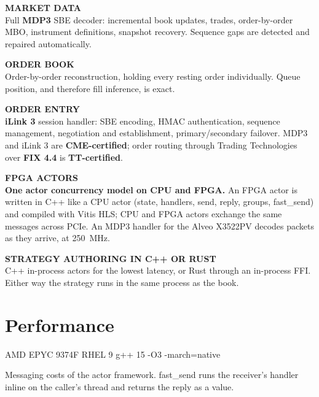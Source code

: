 \documentclass[10pt]{article}
\newcommand{\code}[1]{{\ttfamily\small #1}}
\newcommand{\tile}[2]{%
  {\color{ink3}\sffamily\bfseries\scriptsize\MakeUppercase{#1}}\\[1pt]
  \footnotesize #2\par\vspace{5pt}}
\begin{document}
\begin{minipage}[t]{0.485\textwidth}

\tile{Market data}{Full \textbf{MDP3} SBE decoder: incremental book updates,
trades, order-by-order MBO, instrument definitions, snapshot recovery. Sequence
gaps are detected and repaired automatically.}

\tile{Order book}{Order-by-order reconstruction, holding every resting order
individually. Queue position, and therefore fill inference, is
exact.}

\tile{Order entry}{\textbf{iLink 3} session handler: SBE encoding, HMAC
authentication, sequence management, negotiation and establishment,
primary/secondary failover. MDP3 and iLink 3 are \textbf{CME-certified}; order
routing through Trading Technologies over \textbf{FIX 4.4} is
\textbf{TT-certified}.}

\tile{FPGA actors}{\textbf{One actor concurrency model on CPU and FPGA.} An FPGA
actor is written in C++ like a CPU actor (state, handlers, \code{send},
\code{reply}, groups, \code{fast\_send}) and compiled with Vitis HLS; CPU and
FPGA actors exchange the same messages across PCIe. An MDP3 handler for the
Alveo X3522PV decodes packets as they arrive, at 250~MHz.}

\tile{Strategy authoring in C++ or Rust}{C++ in-process actors for the lowest
latency, or Rust through an in-process FFI. Either way the strategy runs
in the same process as the book.}

\end{minipage}

\section{Performance}

\vspace{-2pt}
{\color{ink3}\footnotesize AMD EPYC 9374F \quad\textperiodcentered\quad RHEL 9
\quad\textperiodcentered\quad g++ 15 \quad\textperiodcentered\quad
\code{-O3 -march=native}}
\vspace{4pt}

Messaging costs of the actor framework. \code{fast\_send} runs the
receiver's handler inline on the caller's thread and returns the reply as a value.
\end{document}
